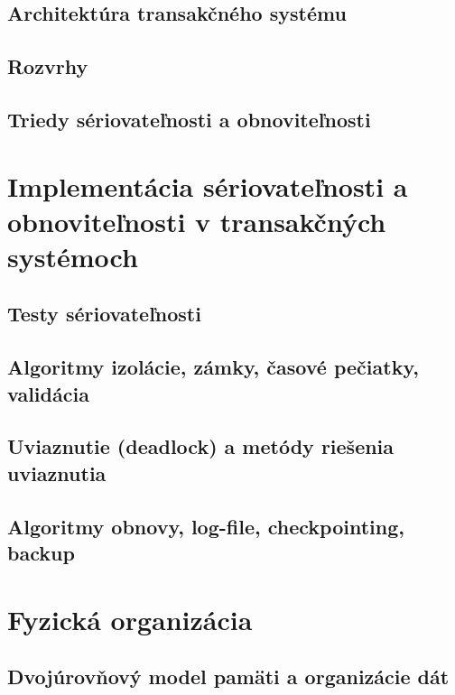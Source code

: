 \documentclass[10pt,a4paper]{article}
\begin{document}
\subsection{Architektúra transakčného systému}
\subsection{Rozvrhy}
\subsection{Triedy sériovateľnosti a obnoviteľnosti}
    
\section{Implementácia sériovateľnosti a obnoviteľnosti v transakčných systémoch} 
\subsection{Testy sériovateľnosti}
\subsection{Algoritmy izolácie, zámky, časové pečiatky, validácia}
\subsection{Uviaznutie (deadlock) a metódy riešenia uviaznutia}
\subsection{Algoritmy obnovy, log-file, checkpointing, backup}
    
\section{Fyzická organizácia} 
\subsection{Dvojúrovňový model pamäti a organizácie dát}
\end{document}
